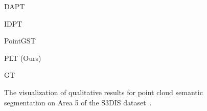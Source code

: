 \begin{figure}[htbp]
    \vspace{0.5em}
    \begin{minipage}{0.09\textwidth} %
        \color{white}{12}
    \end{minipage}
    \hfill
    \begin{minipage}{0.17\textwidth} %
        \centering
        DAPT
    \end{minipage}
    \hfill
    \begin{minipage}{0.17\textwidth} %
        \centering
        IDPT
    \end{minipage}
    \hfill
    \begin{minipage}{0.17\textwidth} %
        \centering
        PointGST
    \end{minipage}
    \hfill
    \begin{minipage}{0.17\textwidth} %
        \centering
        PLT (Ours)
    \end{minipage}
    \hfill
    \begin{minipage}{0.17\textwidth} %
        \centering
        GT
    \end{minipage}
    \hfill
    \caption{The visualization of qualitative results for point cloud semantic segmentation on Area 5 of the S3DIS dataset~\cite{armeni20163d}. %
    }
    \label{fig:s3dis_1}

\end{figure}
